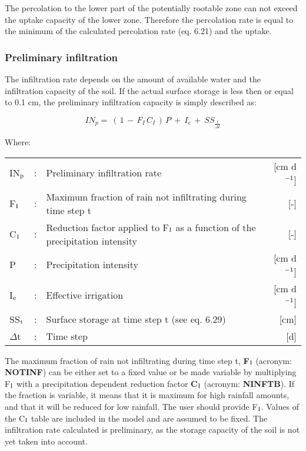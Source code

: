 The percolation to the lower part of the potentially rootable zone can not exceed the
uptake capacity of the lower zone. Therefore the percolation rate is equal to the minimum
of the calculated percolation rate (eq. 6.21) and the uptake.

\subsubsection{Preliminary infiltration}
The infiltration rate depends on the amount of available water and the infiltration capacity
of the soil. If the actual surface storage is less then or equal to 0.1 cm, the preliminary
infiltration capacity is simply described as:

\begin{equation}
IN_{p} =~ (\, 1\, -\, F _{I} \, C _{I} \, )\, P~+~ I _{e~} +~ SS _{\frac{t}{ \Delta t}} 
\end{equation}

Where:\\[5pt]
\begin{tabularx}{\textwidth}{llXr}
IN$_{{\rm p}}$ &:& Preliminary infiltration rate  & [cm d$^{{\rm -1}}$]\\
F$_{{\rm I}}$ &:& Maximum fraction of rain not infiltrating during time step t  & [-]\\
C$_{{\rm I}}$ &:& Reduction factor applied to F$_{{\rm I}}$ as a function of the 
   precipitation intensity  & [-]\\
P &:& Precipitation intensity  & [cm d$^{{\rm -1}}$]\\
I$_{{\rm e}}$ &:& Effective irrigation  & [cm d$^{{\rm -1}}$]\\
SS$_{{\rm t}}$ &:& Surface storage at time step t (see eq. 6.29)  & [cm]\\
$\Delta$t &:& Time step  & [d]\\
\end{tabularx}

The maximum fraction of rain not infiltrating during time step t, {\bf F$_{{\rm I}}$} 
(acronym: {\bf NOTINF})
can be either set to a fixed value or be made variable by multiplying F$_{{\rm I}}$ 
with a precipita\-tion dependent reduction factor {\bf C$_{{\rm I}}$} (acronym: {\bf NINFTB}). 
If the fraction is variable, it means that it is maximum for high rainfall amounts, and 
that it will be reduced for low rainfall. The user should provide F$_{{\rm I}}$. 
Values of the C$_{{\rm I}}$ table are included in the model and
are assumed to be fixed. The infiltration rate calculated is preliminary, as the storage
capacity of the soil is not yet taken into account. 

